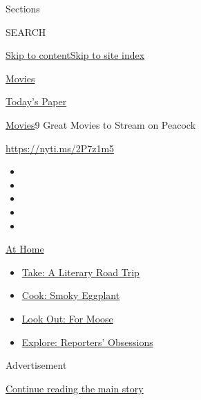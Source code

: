 Sections

SEARCH

\protect\hyperlink{site-content}{Skip to
content}\protect\hyperlink{site-index}{Skip to site index}

\href{https://www.nytimes.com/section/movies}{Movies}

\href{https://myaccount.nytimes.com/auth/login?response_type=cookie\&client_id=vi}{}

\href{https://www.nytimes.com/section/todayspaper}{Today's Paper}

\href{/section/movies}{Movies}\textbar{}9 Great Movies to Stream on
Peacock

\url{https://nyti.ms/2P7z1m5}

\begin{itemize}
\item
\item
\item
\item
\item
\end{itemize}

\href{https://www.nytimes.com/spotlight/at-home?action=click\&pgtype=Article\&state=default\&region=TOP_BANNER\&context=at_home_menu}{At
Home}

\begin{itemize}
\tightlist
\item
  \href{https://www.nytimes.com/2020/07/28/books/time-for-a-literary-road-trip.html?action=click\&pgtype=Article\&state=default\&region=TOP_BANNER\&context=at_home_menu}{Take:
  A Literary Road Trip}
\item
  \href{https://www.nytimes.com/2020/07/29/magazine/bored-with-your-home-cooking-some-smoky-eggplant-will-fix-that.html?action=click\&pgtype=Article\&state=default\&region=TOP_BANNER\&context=at_home_menu}{Cook:
  Smoky Eggplant}
\item
  \href{https://www.nytimes.com/2020/07/27/travel/moose-michigan-isle-royale.html?action=click\&pgtype=Article\&state=default\&region=TOP_BANNER\&context=at_home_menu}{Look
  Out: For Moose}
\item
  \href{https://www.nytimes.com/interactive/2020/at-home/even-more-reporters-editors-diaries-lists-recommendations.html?action=click\&pgtype=Article\&state=default\&region=TOP_BANNER\&context=at_home_menu}{Explore:
  Reporters' Obsessions}
\end{itemize}

Advertisement

\protect\hyperlink{after-top}{Continue reading the main story}


